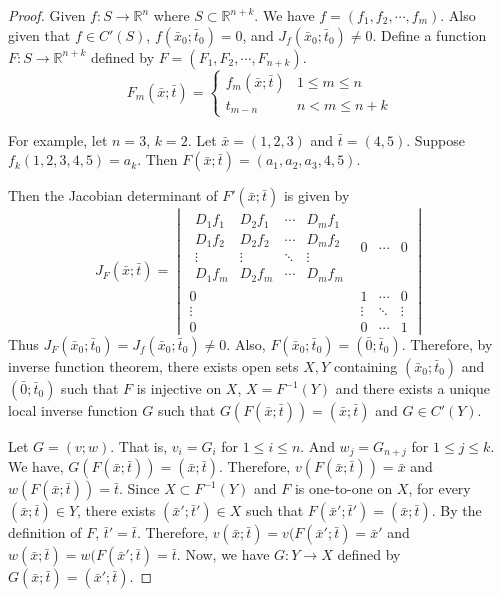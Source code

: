 \begin{proof}
	Given $f : S \to \mathbb{R}^n$ where $S \subset \mathbb{R}^{n+k}$.
	We have $f = (f_1,f_2,\cdots,f_m)$.
	Also given that $f \in C'(S)$, $f(\bar{x}_0;\bar{t}_0) = 0$, and $J_f(\bar{x}_0;\bar{t}_0) \ne 0$.
	Define a function $F : S \to \mathbb{R}^{n+k}$ defined by $F = (F_1,F_2,\cdots,F_{n+k})$.
	\[ F_m(\bar{x};\bar{t}) = \begin{cases}
		f_m(\bar{x};\bar{t}) & 1 \le m \le n\\
		t_{m-n} & n < m \le n+k
	\end{cases} \]
	\begin{commentary}
		For example, let $n = 3$, $k = 2$.
		Let $\bar{x} = (1,2,3)$ and $\bar{t} = (4,5)$.
		Suppose $f_k(1,2,3,4,5) = a_k$.
		Then $F(\bar{x};\bar{t}) = (a_1,a_2,a_3,4,5)$.
	\end{commentary}

	Then the Jacobian determinant of $F'(\bar{x};\bar{t})$ is given by
	\[ J_F(\bar{x};\bar{t}) = \begin{vmatrix}
		\begin{matrix}
			D_1f_1 & D_2f_1 & \cdots & D_mf_1 \\
			D_1f_2 & D_2f_2 & \cdots & D_mf_2 \\
			\vdots & \vdots & \ddots & \vdots \\
			D_1f_m & D_2f_m & \cdots & D_mf_m
		\end{matrix}
		& 0 & \cdots & 0 \\
		0 & 1 & \cdots & 0 \\
		\vdots & \vdots & \ddots & \vdots \\
		0 & 0 & \cdots & 1 
	\end{vmatrix} \]
	Thus $J_F(\bar{x}_0;\bar{t}_0) = J_f(\bar{x}_0;\bar{t}_0) \ne 0$.
	Also, $F(\bar{x}_0;\bar{t}_0) = (\bar{0};\bar{t}_0)$.
	Therefore, by inverse function theorem, there exists open sets $X,Y$ containing $(\bar{x}_0;\bar{t}_0)$ and $(\bar{0};\bar{t}_0)$ such that $F$ is injective on $X$, $X = F^{-1}(Y)$ and there exists a unique local inverse function $G$ such that $G(F(\bar{x};\bar{t})) = (\bar{x};\bar{t})$ and $G \in C'(Y)$.

	Let $G = (v;w)$.
	That is, $v_i = G_i$ for $1 \le i \le n$.
	And $w_j = G_{n+j}$ for $1 \le j \le k$.
	We have, $G(F(\bar{x};\bar{t})) = (\bar{x};\bar{t})$.
	Therefore, $v(F(\bar{x};\bar{t})) = \bar{x}$ and $w(F(\bar{x};\bar{t})) = \bar{t}$.
	Since $X \subset F^{-1}(Y)$ and $F$ is one-to-one on $X$, for every $(\bar{x};\bar{t}) \in Y$, there exists $(\bar{x}';\bar{t}') \in X$ such that $F(\bar{x}';\bar{t}') = (\bar{x};\bar{t})$.
	By the definition of $F$, $\bar{t}' = \bar{t}$.
	Therefore, $v(\bar{x};\bar{t}) = v(F(\bar{x}';\bar{t}) = \bar{x}'$ and $w(\bar{x};\bar{t}) = w(F(\bar{x}';\bar{t}) = \bar{t}$.
	Now, we have $G : Y \to X$ defined by $G(\bar{x};\bar{t}) = (\bar{x}';\bar{t})$.


\end{proof}

